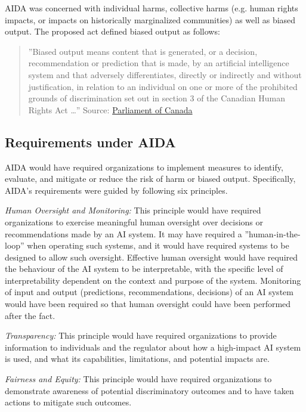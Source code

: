 \begin{advanced}
AIDA was concerned with individual harms, collective harms (e.g. human rights impacts, or impacts on historically marginalized communities) as well as biased output. The proposed act defined biased output as follows:

\begin{quote}''Biased output means content that is generated, or a decision, recommendation or prediction that is made, by an artificial intelligence system and that adversely differentiates, directly or indirectly and without justification, in relation to an individual on one or more of the prohibited grounds of discrimination set out in section 3 of the Canadian Human Rights Act \ldots'' \footnotesize Source: \href{https://www.parl.ca/legisinfo/en/bill/44-1/c-27}{Parliament of Canada} \normalsize \end{quote} 

\subsection*{Requirements under AIDA}

AIDA would have required organizations to implement measures to identify, evaluate, and mitigate or reduce the risk of harm or biased output. Specifically, AIDA's requirements were guided by following six principles.

\emph{Human Oversight and Monitoring:} This principle would have required organizations to exercise meaningful human oversight over decisions or recommendations made by an AI system. It may have required a ''human-in-the-loop'' when operating such systems, and it would have required systems to be designed to allow such oversight. Effective human oversight would have required the behaviour of the AI system to be interpretable, with the specific level of interpretability dependent on the context and purpose of the system. Monitoring of input and output (predictions, recommendations, decisions) of an AI system would have been required so that human oversight could have been performed after the fact. 

\emph{Transparency:} This principle would have required organizations to provide information to individuals and the regulator about how a high-impact AI system is used, and what its capabilities, limitations, and potential impacts are. 

\emph{Fairness and Equity:} This principle would have required organizations to demonstrate awareness of potential discriminatory outcomes and to have taken actions to mitigate such outcomes.


\end{advanced}
